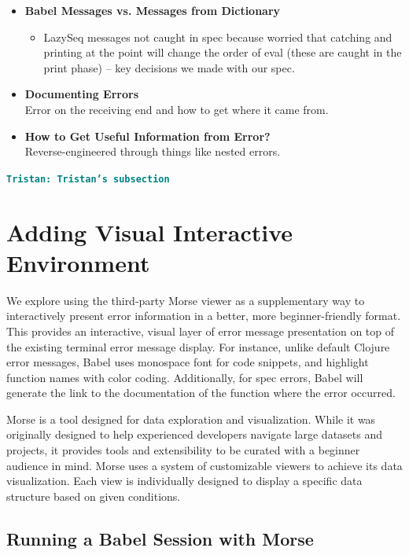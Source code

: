 \documentclass[12pt]{article}
\newcommand{\comment}[1]{{\bf \tt  {#1}}}
\newcommand{\tkcomment}[1]{\textcolor{Teal}{\comment{Tristan: {#1}}}}
\begin{document}
\begin{itemize}

    \item \textbf{Babel Messages vs. Messages from Dictionary} \\
    \begin{itemize}
        \item LazySeq messages not caught in spec because worried that catching and printing at the point will change the order of eval (these are caught in the print phase) -- key decisions we made with our spec.
    \end{itemize}

    \item \textbf{Documenting Errors} \\
    Error on the receiving end and how to get where it came from.

    \item \textbf{How to Get Useful Information from Error?} \\
    Reverse-engineered through things like nested errors.

\end{itemize}
\tkcomment{Tristan's subsection}

\section{Adding Visual Interactive Environment}\label{sec:interactive}

We explore using the third-party Morse viewer as a supplementary way to interactively present error information in a better, more beginner-friendly format.
This provides an interactive, visual layer of error message presentation on top of the existing terminal error message display.
For instance, unlike default Clojure error messages, Babel uses monospace font for code snippets, and highlight function names with color coding. 
Additionally, for spec errors, Babel will generate the link to the documentation of the function where the error occurred.

Morse is a tool designed for data exploration and visualization.
While it was originally designed to help experienced developers navigate large datasets and projects, 
it provides tools and extensibility to be curated with a beginner audience in mind.
Morse uses a system of customizable viewers to achieve its data visualization.
Each view is individually designed to display a specific data structure based on given conditions.

\subsection{Running a Babel Session with Morse}\label{subsec:babel-w-morse}
\end{document}
